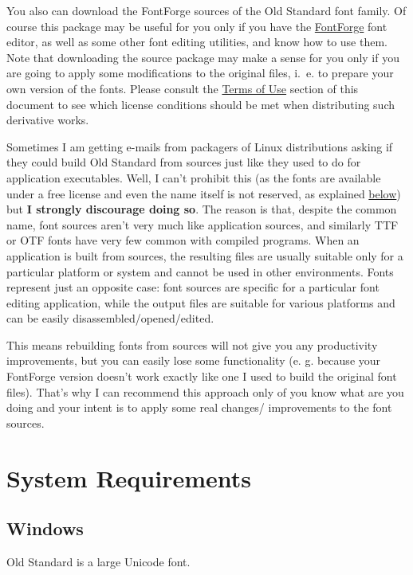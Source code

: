 \documentclass[12pt,a4paper,openany]{book}
\begin{document}
You also can download the FontForge sources of the Old Standard font family.
Of course this package may be useful for you only if you have the 
\href{http://fontforge.sourceforge.net}{FontForge} font editor, as well
as some other font editing utilities, and know how to use them.
Note that downloading the source package may make a sense for you only
if you are going to apply some modifications to the original files, i.~e.
to prepare your own version of the fonts. Please consult the 
\hyperlink{license}{Terms of Use} section of this document to see which
license conditions should be met when distributing such derivative works.

Sometimes I am getting e-mails from packagers of Linux distributions
asking if they could build Old Standard from sources just like they used to
do for application executables. Well, I can't prohibit this (as the fonts
are available under a free license and even the name itself is not reserved,
as explained \hyperlink{license}{below}) but \textbf{I strongly discourage
doing so}. The reason is that, despite the common name, font sources aren't
very much like application sources, and similarly TTF or OTF fonts have very
few common with compiled programs. When an application is built from sources,
the resulting files are usually suitable only for a particular platform or
system and cannot be used in other environments. Fonts represent just an
opposite case: font sources are specific for a particular font editing
application, while the output files are suitable for various platforms and
can be easily disassembled/opened/edited. 

This means rebuilding fonts from sources will not give you any productivity 
improvements, but you can easily lose some functionality (e. g. because 
your FontForge version doesn't work exactly like one I used to build the
original font files). That's why I can recommend this approach only of you
know what are you doing and your intent is to apply some real changes/
improvements to the font sources.

\section{System Requirements}

\subsection{Windows}

Old Standard is a large Unicode font.
\end{document}
